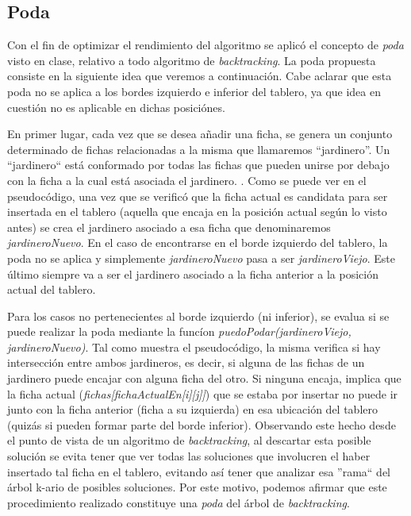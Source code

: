 \documentclass[a4paper,10pt] {article}
\begin{document}
\subsection*{Poda}

Con el fin de optimizar el rendimiento del algoritmo se aplicó el concepto de \textit{poda} visto en clase, relativo a todo algoritmo de \textit{backtracking}. La poda propuesta consiste en la siguiente idea que veremos a continuaci\'on. Cabe aclarar que esta poda no se aplica a los bordes izquierdo e inferior del tablero, ya que idea en cuesti\'on no es aplicable en dichas posici\'ones.

En primer lugar, cada vez que se desea añadir una ficha, se genera un conjunto determinado de fichas relacionadas a la misma que llamaremos ``jardinero''. Un ``jardinero`` est\'a conformado por todas las fichas que pueden unirse por debajo con la ficha a la cual est\'a asociada el jardinero. . Como se puede ver en el pseudoc\'odigo, una vez que se verific\'o que la ficha actual es candidata para ser insertada en el tablero (aquella que encaja en la posici\'on actual seg\'un lo visto antes) se crea el jardinero asociado a esa ficha que denominaremos \textit{jardineroNuevo}. En el caso de encontrarse en el borde izquierdo del tablero, la poda no se aplica y simplemente \textit{jardineroNuevo} pasa a ser \textit{jardineroViejo}. Este \'ultimo siempre va a ser el jardinero asociado a la ficha anterior a la posici\'on actual del tablero. 

Para los casos no pertenecientes al borde izquierdo (ni inferior), se evalua si se puede realizar la poda mediante la func\'ion \textit{puedoPodar(jardineroViejo, jardineroNuevo)}. Tal como muestra el pseudoc\'odigo, la misma verifica si hay intersecci\'on entre ambos jardineros, es decir, si alguna de las fichas de un jardinero puede encajar con alguna ficha del otro. Si ninguna encaja, implica que la ficha actual (\textit{fichas[fichaActualEn[i][j]]}) que se estaba por insertar no puede ir junto con la ficha anterior (ficha a su izquierda) en esa ubicaci\'on del tablero (quiz\'as si pueden formar parte del borde inferior). Observando este hecho desde el punto de vista de un algoritmo de \textit{backtracking}, al descartar esta posible soluci\'on se evita tener que ver todas las soluciones que involucren el haber insertado tal ficha en el tablero, evitando as\'i tener que analizar esa ''rama`` del \'arbol k-ario de posibles soluciones. Por este motivo, podemos afirmar que este procedimiento realizado constituye una \textit{poda} del \'arbol de \textit{backtracking}.
\end{document}

